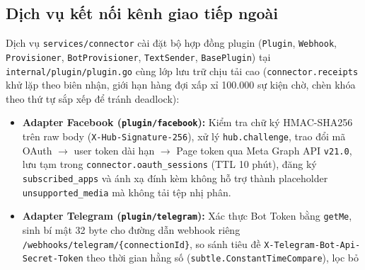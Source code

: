 \subsection{Dịch vụ kết nối kênh giao tiếp ngoài}
Dịch vụ \texttt{services/\hspace{0pt}connector} cài đặt bộ hợp đồng plugin (\texttt{Plugin}, \texttt{Webhook}, \texttt{Provisioner}, \texttt{BotProvisioner}, \texttt{TextSender},
\texttt{BasePlugin}) tại \texttt{internal/\hspace{0pt}plugin/\hspace{0pt}plugin.go} cùng lớp lưu trữ chịu tải cao (\texttt{connector.\hspace{0pt}receipts} khử lặp theo biên nhận, giới hạn hàng đợi xấp xỉ 100.000
sự kiện chờ, chèn khóa theo thứ tự sắp xếp để tránh deadlock):
\begin{itemize}
  \item \textbf{Adapter Facebook (\texttt{plugin/\hspace{0pt}facebook}):} Kiểm tra chữ ký HMAC-SHA256 trên raw body (\texttt{X-\hspace{0pt}Hub-\hspace{0pt}Signature-\hspace{0pt}256}), xử lý \texttt{hub.\hspace{0pt}challenge}, trao đổi
    mã OAuth $\rightarrow$ user token dài hạn $\rightarrow$ Page token qua Meta Graph API \texttt{v21.0}, lưu tạm trong \texttt{connector.\hspace{0pt}oauth\_\hspace{0pt}sessions} (TTL 10 phút), đăng
    ký \texttt{subscribed\_\hspace{0pt}apps} và ánh xạ đính kèm không hỗ trợ thành placeholder \texttt{unsupported\_\hspace{0pt}media} mà không tải tệp nhị phân.
  \item \textbf{Adapter Telegram (\texttt{plugin/\hspace{0pt}telegram}):} Xác thực Bot Token bằng \texttt{getMe}, sinh bí mật 32 byte cho đường dẫn webhook riêng
    \texttt{/webhooks/\hspace{0pt}telegram/\hspace{0pt}\{connectionId\}}, so sánh tiêu đề \texttt{X-\hspace{0pt}Telegram-\hspace{0pt}Bot-\hspace{0pt}Api-\hspace{0pt}Secret-\hspace{0pt}Token} theo thời gian hằng số (\texttt{subtle.\hspace{0pt}ConstantTimeCompare}), lọc bỏ

\end{itemize}
